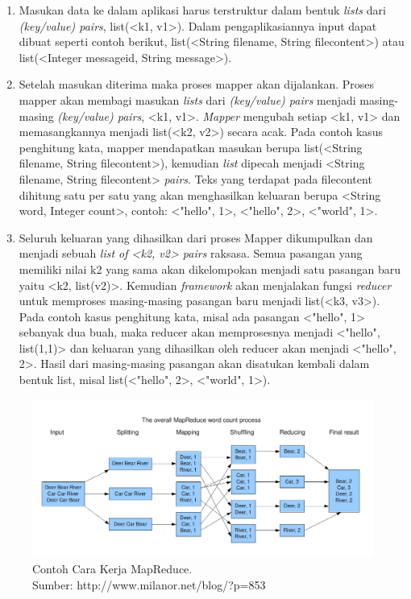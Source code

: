 \begin{enumerate}
	\item Masukan data ke dalam aplikasi harus terstruktur dalam bentuk \textit{lists} dari \textit{(key/value) pairs}, list(<k1, v1>). Dalam pengaplikasiannya input dapat dibuat seperti contoh berikut, list(<String filename, String filecontent>) atau list(<Integer messageid, String message>).
	\item Setelah masukan diterima maka proses mapper akan dijalankan. Proses mapper akan membagi masukan \textit{lists} dari \textit{(key/value) pairs} menjadi masing-masing \textit{(key/value) pairs}, <k1, v1>. \textit{Mapper} mengubah setiap <k1, v1> dan memasangkannya menjadi list(<k2, v2>) secara acak. Pada contoh kasus penghitung kata, mapper mendapatkan masukan berupa list(<String filename, String filecontent>), kemudian \textit{list} dipecah menjadi <String filename, String filecontent> \textit{pairs}. Teks yang terdapat pada filecontent dihitung satu per satu yang akan menghasilkan keluaran berupa <String word, Integer count>, contoh: <"hello", 1>, <"hello", 2>, <"world", 1>. 
	\item Seluruh keluaran yang dihasilkan dari proses Mapper dikumpulkan dan menjadi sebuah \textit{list of <k2, v2> pairs} raksasa. Semua pasangan yang memiliki nilai k2 yang sama akan dikelompokan menjadi satu pasangan baru yaitu <k2, list(v2)>. Kemudian \textit{framework} akan menjalakan fungsi \textit{reducer} untuk memproses masing-masing pasangan baru menjadi list(<k3, v3>). Pada contoh kasus penghitung kata, misal ada pasangan <"hello", 1> sebanyak dua buah, maka reducer akan memprosesnya menjadi <"hello", list(1,1)> dan keluaran yang dihasilkan oleh reducer akan menjadi <"hello", 2>. Hasil dari masing-masing pasangan akan disatukan kembali dalam bentuk list, misal list(<"hello", 2>, <"world", 1>).
\end{enumerate} 
	
\begin{figure}
	\centering
	\includegraphics[scale=0.4]{Gambar/MapReduce_Work_Structure.png}
	\caption[Contoh Cara Kerja MapReduce]{Contoh Cara Kerja MapReduce. \\Sumber: http://www.milanor.net/blog/?p=853}
\end{figure}
	
